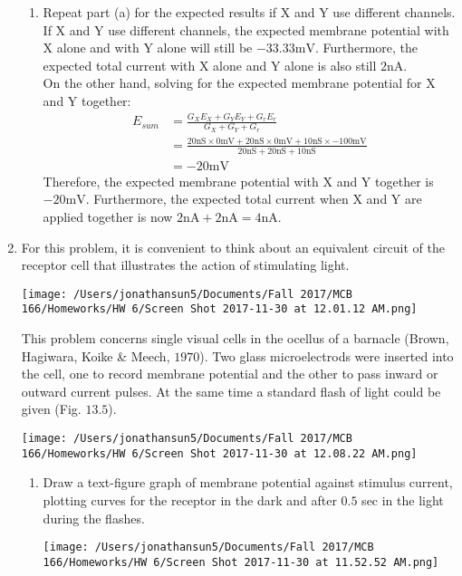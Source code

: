 \documentclass[11pt]{article}
\begin{document}
\begin{enumerate}[label=\arabic*.]
\begin{enumerate}[label=(\alph*)]
\item
Repeat part (a) for the expected results if X and Y use different channels.
\vspace*{1\baselineskip}
\\
If X and Y use different channels, the expected membrane potential with X alone and with Y alone will still be $-33.33 \text{mV}$. Furthermore, the expected total current with X alone and Y alone is also still $2 \text{nA}$.
\\
On the other hand, solving for the expected membrane potential for X and Y together:
\begin{align*}
E_{sum} &= \frac{G_X E_X + G_Y E_Y + G_r E_r} {G_X + G_Y + G_r} \\
 &= \frac{20 \text{nS} \times 0 \text{mV} + 20 \text{nS} \times 0 \text{mV} + 10 \text{nS} \times -100 \text{mV}} {20 \text{nS} + 20 \text{nS} + 10 \text{nS}} \\
 &= -20 \text{mV}
\end{align*}
Therefore, the expected membrane potential with X and Y together is $-20 \text{mV}$. Furthermore, the expected total current when X and Y are applied together is now $2 \text{nA} + 2 \text{nA} = 4 \text{nA}$.
\end{enumerate}



\newpage
\item
For this problem, it is convenient to think about an equivalent circuit of the receptor cell that illustrates the action of stimulating light.
\begin{center}
\texttt{[image: /Users/jonathansun5/Documents/Fall 2017/MCB 166/Homeworks/HW 6/Screen Shot 2017-11-30 at 12.01.12 AM.png]}
\end{center}
This problem concerns single visual cells in the ocellus of a barnacle (Brown, Hagiwara, Koike \& Meech, $1970$). Two glass microelectrods were inserted into the cell, one to record membrane potential and the other to pass inward or outward current pulses. At the same time a standard flash of light could be given (Fig. $13.5$).
\begin{center}
\texttt{[image: /Users/jonathansun5/Documents/Fall 2017/MCB 166/Homeworks/HW 6/Screen Shot 2017-11-30 at 12.08.22 AM.png]}
\end{center}
\begin{enumerate}[label=(\alph*)]
\item
Draw a text-figure graph of membrane potential against stimulus current, plotting curves for the receptor in the dark and after $0.5$ sec in the light during the flashes.
\begin{center}
\texttt{[image: /Users/jonathansun5/Documents/Fall 2017/MCB 166/Homeworks/HW 6/Screen Shot 2017-11-30 at 11.52.52 AM.png]}
\end{center}




\end{enumerate}
\end{enumerate}
\end{document}
